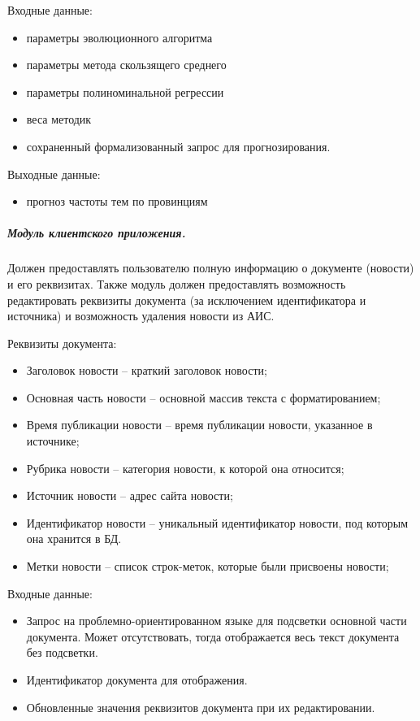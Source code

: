 Входные данные:
\begin{itemize}
\item параметры эволюционного алгоритма 
\item параметры метода скользящего среднего
\item параметры полиноминальной регрессии
\item веса методик
\item сохраненный формализованный запрос для прогнозирования.
\end{itemize}

Выходные данные:
\begin{itemize}
\item прогноз частоты тем по провинциям
\end{itemize}

\clearpage
\subparagraph{Модуль клиентского приложения.} \hfill

Должен предоставлять пользователю полную информацию о документе (новости) и его реквизитах. Также модуль должен предоставлять возможность редактировать реквизиты документа (за исключением идентификатора и источника) и возможность удаления новости из АИС.

Реквизиты документа:
\begin{itemize}
\item Заголовок новости -- краткий заголовок новости;
\item Основная часть новости -- основной массив текста с форматированием;
\item Время публикации новости -- время публикации новости, указанное в
источнике;
\item Рубрика новости -- категория новости, к которой она относится;
\item Источник новости -- адрес сайта новости;
\item Идентификатор новости -- уникальный идентификатор новости, под
которым она хранится в БД.
\item Метки новости -- список строк-меток, которые были присвоены новости;
\end{itemize}

Входные данные:
\begin{itemize}
\item Запрос на проблемно-ориентированном языке для подсветки основной части документа. Может отсутствовать, тогда отображается весь текст документа без подсветки.
\item Идентификатор документа для отображения.
\item Обновленные значения реквизитов документа при их редактировании.
\end{itemize}

